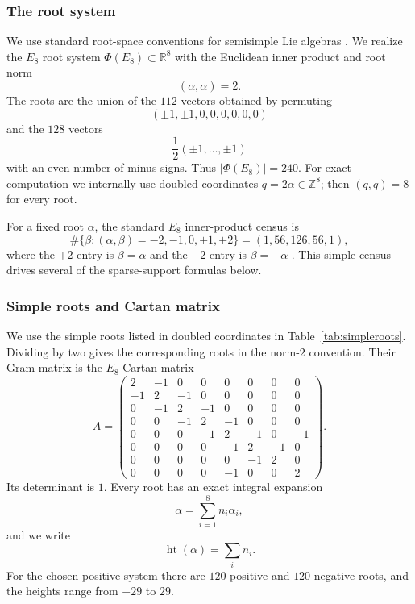 \documentclass[11pt]{article}
\theoremstyle{definition}
\theoremstyle{remark}
\newcommand{\PhiE}{\Phi(E_8)}
\begin{document}
\subsubsection{The root system}

We use standard root-space conventions for semisimple Lie algebras \cite{Humphreys1972}.  We realize the $E_8$ root system $\PhiE\subset\mathbb R^8$ with the Euclidean inner product and root norm
\[
(\alpha,\alpha)=2.
\]
The roots are the union of the $112$ vectors obtained by permuting
\[
(\pm1,\pm1,0,0,0,0,0,0)
\]
and the $128$ vectors
\[
\frac12(\pm1,\ldots,\pm1)
\]
with an even number of minus signs.  Thus $|\PhiE|=240$.  For exact computation we internally use doubled coordinates $q=2\alpha\in\mathbb Z^8$; then $(q,q)=8$ for every root.

For a fixed root $\alpha$, the standard $E_8$ inner-product census is
\begin{equation}\label{eq:innercensus}
\#\{\beta:(\alpha,\beta)=-2,-1,0,+1,+2\}
=
(1,56,126,56,1),
\end{equation}
where the $+2$ entry is $\beta=\alpha$ and the $-2$ entry is $\beta=-\alpha$ \cite{WinterVanLuijk2021}.  This simple census drives several of the sparse-support formulas below.

\subsubsection{Simple roots and Cartan matrix}

We use the simple roots listed in doubled coordinates in Table~\ref{tab:simpleroots}.  Dividing by two gives the corresponding roots in the norm-$2$ convention.  Their Gram matrix is the $E_8$ Cartan matrix
\begin{equation}\label{eq:cartanmatrix}
A=
\begin{pmatrix}
2&-1&0&0&0&0&0&0\\
-1&2&-1&0&0&0&0&0\\
0&-1&2&-1&0&0&0&0\\
0&0&-1&2&-1&0&0&0\\
0&0&0&-1&2&-1&0&-1\\
0&0&0&0&-1&2&-1&0\\
0&0&0&0&0&-1&2&0\\
0&0&0&0&-1&0&0&2
\end{pmatrix}.
\end{equation}
Its determinant is $1$.  Every root has an exact integral expansion
\[
\alpha=\sum_{i=1}^8 n_i\alpha_i,
\]
and we write
\[
\operatorname{ht}(\alpha)=\sum_i n_i.
\]
For the chosen positive system there are $120$ positive and $120$ negative roots, and the heights range from $-29$ to $29$.
\end{document}
